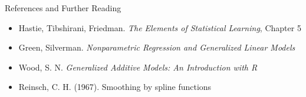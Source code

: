 \documentclass[aspectratio=169]{beamer}
\begin{document}
\begin{frame}{References and Further Reading}
\begin{itemize}
    \item Hastie, Tibshirani, Friedman. \textit{The Elements of Statistical Learning}, Chapter 5
    \item Green, Silverman. \textit{Nonparametric Regression and Generalized Linear Models}
    \item Wood, S. N. \textit{Generalized Additive Models: An Introduction with R}
    \item Reinsch, C. H. (1967). Smoothing by spline functions
\end{itemize}
\end{frame}
\end{document}

